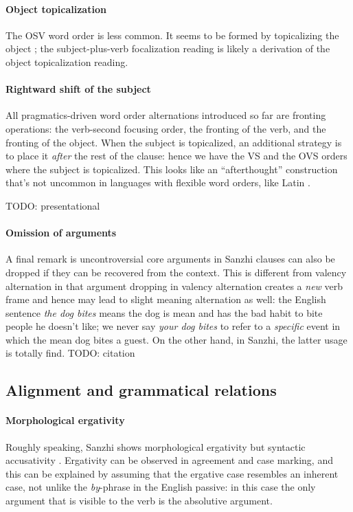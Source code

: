 \documentclass[a4paper, oneside, 12pt]{report}
\newcommand*{\citesec}[1]{\S~{#1}}
\newcommand*{\citepage}[1]{p.~{#1}}
\newcommand{\form}[1]{\emph{#1}}
\begin{document}
\paragraph*{Object topicalization}
The OSV word order is less common.
It seems to be formed by topicalizing the object \citep[\citepage{522}]{forker2020grammar}; 
the subject-plus-verb focalization reading is likely a derivation 
of the object topicalization reading.

\paragraph*{Rightward shift of the subject}
All pragmatics-driven word order alternations introduced so far are fronting operations: 
the verb-second focusing order, 
the fronting of the verb, and the fronting of the object.
When the subject is topicalized, an additional strategy is to place it \emph{after} the rest of the clause: 
hence we have the VS and the OVS orders where the subject is topicalized.
This looks like an ``afterthought'' construction that's 
not uncommon in languages with flexible word orders, 
like Latin \citep[\citepage{39}]{devine2006latin}.


TODO: presentational

\paragraph*{Omission of arguments} 
A final remark is uncontroversial core arguments in Sanzhi clauses can also be dropped 
if they can be recovered from the context.
This is different from valency alternation in that 
argument dropping in valency alternation creates a \emph{new} verb frame 
and hence may lead to slight meaning alternation as well:
the English sentence \form{the dog bites} means 
the dog is mean and has the bad habit to bite people he doesn't like; 
we never say \form{your dog bites} to refer to a \emph{specific} event 
in which the mean dog bites a guest.
On the other hand, in Sanzhi, the latter usage is totally find. TODO: citation 

\subsection{Alignment and grammatical relations} 

\paragraph*{Morphological ergativity}
Roughly speaking, Sanzhi shows morphological ergativity 
but syntactic accusativity \citep[\citesec{22.3}]{forker2020grammar}.
Ergativity can be observed in agreement and case marking, 
and this can be explained by assuming that 
the ergative case resembles an inherent case, 
not unlike the \form{by}-phrase in the English passive:
in this case the only argument that is visible to the verb 
is the absolutive argument.
\end{document}
